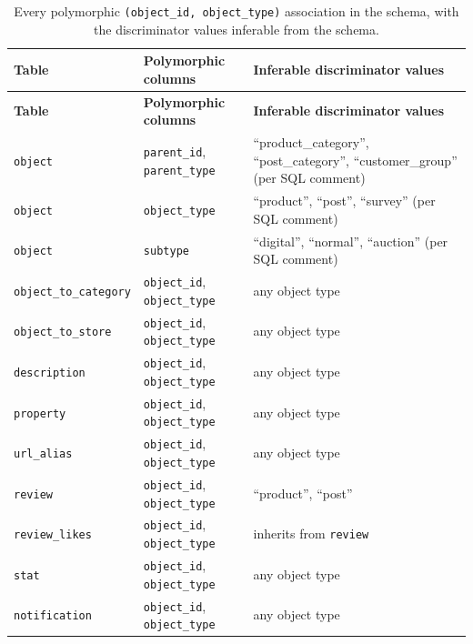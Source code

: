 \documentclass[11pt,a4paper]{article}
\begin{document}
\footnotesize\sloppy
\begin{longtable}{>{\raggedright\arraybackslash}p{4.3cm}>{\raggedright\arraybackslash}p{4.6cm}>{\raggedright\arraybackslash}p{5.5cm}}
\caption{Every polymorphic \texttt{(object\_id, object\_type)} association in the schema, with the discriminator values inferable from the schema.}\label{tab:poly-full}\\
\toprule
\textbf{Table} & \textbf{Polymorphic columns} & \textbf{Inferable discriminator values} \\
\midrule
\endfirsthead
\toprule
\textbf{Table} & \textbf{Polymorphic columns} & \textbf{Inferable discriminator values} \\
\midrule
\endhead
\bottomrule
\endfoot
\texttt{object}                 & \texttt{parent\_id}, \texttt{parent\_type}             & ``product\_category'', ``post\_category'', ``customer\_group'' (per SQL comment) \\
\texttt{object}                 & \texttt{object\_type}                                  & ``product'', ``post'', ``survey'' (per SQL comment) \\
\texttt{object}                 & \texttt{subtype}                                       & ``digital'', ``normal'', ``auction'' (per SQL comment) \\
\texttt{object\_to\_category}   & \texttt{object\_id}, \texttt{object\_type}             & any object type \\
\texttt{object\_to\_store}      & \texttt{object\_id}, \texttt{object\_type}             & any object type \\
\texttt{description}            & \texttt{object\_id}, \texttt{object\_type}             & any object type \\
\texttt{property}               & \texttt{object\_id}, \texttt{object\_type}             & any object type \\
\texttt{url\_alias}             & \texttt{object\_id}, \texttt{object\_type}             & any object type \\
\texttt{review}                 & \texttt{object\_id}, \texttt{object\_type}             & ``product'', ``post'' \\
\texttt{review\_likes}          & \texttt{object\_id}, \texttt{object\_type}             & inherits from \texttt{review} \\
\texttt{stat}                   & \texttt{object\_id}, \texttt{object\_type}             & any object type \\
\texttt{notification}           & \texttt{object\_id}, \texttt{object\_type}             & any object type \\

\end{longtable}
\end{document}
